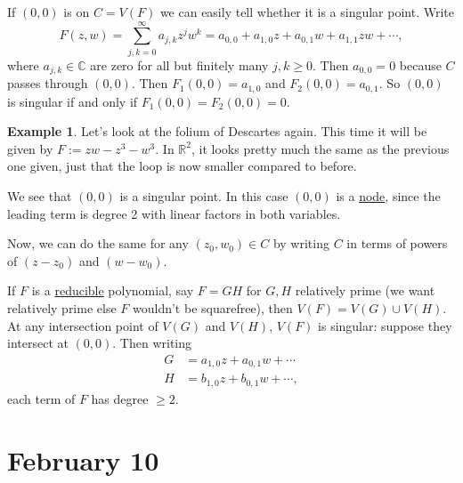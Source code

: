 \documentclass[12pt]{article}
\newcommand{\cx}{\mathbb{C}}
\newcommand{\real}{\mathbb{R}}
\theoremstyle{definition}
\newtheorem{example}[theorem]{Example}
\theoremstyle{remark}
\begin{document}
If $(0,0)$ is on $C=V(F)$ we can easily tell whether it is a singular point. Write 
\begin{equation}
    F(z,w)=\sum\limits_{j,k=0}^{\infty}a_{j,k}z^jw^k=a_{0,0}+a_{1,0}z+a_{0,1}w+a_{1,1}zw+\dotsb,
\end{equation}
where $a_{j,k}\in\cx$ are zero for all but finitely many $j,k\geq0$. Then $a_{0,0}=0$ because $C$ passes through $(0,0)$. Then $F_1(0,0)=a_{1,0}$ and $F_2(0,0)=a_{0,1}$. So $(0,0)$ is singular if and only if $F_1(0,0)=F_2(0,0)=0$.
\begin{example}
    Let's look at the folium of Descartes again. This time it will be given by $F:=zw-z^3-w^3$. In $\real^2$, it looks pretty much the same as the previous one given, just that the loop is now smaller compared to before. 
    
    We see that $(0,0)$ is a singular point. In this case $(0,0)$ is a \underline{node}, since the leading term is degree 2 with linear factors in both variables.
\end{example}
Now, we can do the same for any $(z_0,w_0)\in C$ by writing $C$ in terms of powers of $(z-z_0)$ and $(w-w_0)$.

If $F$ is a \underline{reducible} polynomial, say $F=GH$ for $G,H$ relatively prime (we want relatively prime else $F$ wouldn't be squarefree), then $V(F)=V(G)\cup V(H)$. At any intersection point of $V(G)$ and $V(H)$, $V(F)$ is singular: suppose they intersect at $(0,0)$. Then writing 
\begin{equation}
    \begin{split}
        G&=a_{1,0}z+a_{0,1}w+\dotsb\\
        H&=b_{1,0}z+b_{0,1}w+\dotsb,
    \end{split}
\end{equation}
each term of $F$ has degree $\geq2$.
\section{February 10}
\end{document}
